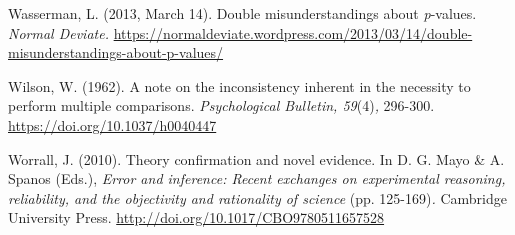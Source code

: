\documentclass[authordate, meta, issue]{jote-new-article}
\begin{document}
Wasserman, L. (2013, March 14). Double misunderstandings about \emph{p}-values. \emph{Normal Deviate.} \url{https://normaldeviate.wordpress.com/2013/03/14/double-misunderstandings-about-p-values/}



Wilson, W. (1962). A note on the inconsistency inherent in the necessity to perform multiple comparisons. \emph{Psychological Bulletin, 59}(4)\emph{,} 296-300. \url{https://doi.org/10.1037/h0040447}



Worrall, J. (2010). Theory conﬁrmation and novel evidence. In D. G. Mayo \& A. Spanos (Eds.), \emph{Error and inference: Recent exchanges on experimental reasoning, reliability, and the objectivity and rationality of science }(pp. 125-169)\emph{.} Cambridge University Press. \url{http://doi.org/10.1017/CBO9780511657528}
\end{document}
